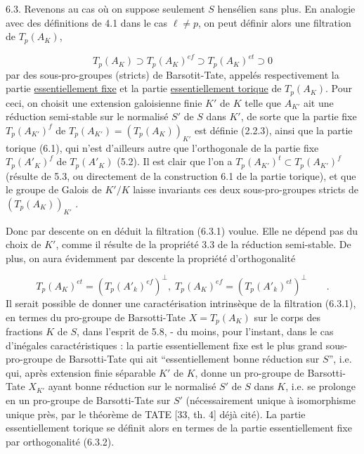 6.3. Revenons au cas où on suppose seulement $S$ hensélien sans plus. En analogie avec des définitions de 4.1 dans le cas $\ell \neq p$, on peut définir alors une filtration de $T_p(A_K)$,

\begin{equation}\tag{6.3.1}
T_p(A_K) \supset T_p(A_K)^{ef} \supset T_p(A_K)^{et} \supset 0
\end{equation}
par des sous-pro-groupes (stricts) de Barsotit-Tate, appelés respectivement la partie \underline{essentiellement fixe} et la partie \underline{essentiellement torique} de $T_p(A_K)$. Pour ceci, on choisit une extension galoisienne finie $K'$ de $K$ telle que $A_{K'}$ ait une réduction semi-stable sur le normalisé $S'$ de $S$ dans $K'$, de sorte que la partie fixe $T_p(A_{K'})^f$ de $T_p(A_{K'})=(T_p(A_K))_{K'}$ est définie (2.2.3), ainsi que la partie torique (6.1), qui n'est d'ailleurs autre que l'orthogonale de la partie fixe $T_p(A'_K)^f$ de $T_p(A'_K)$ (5.2). Il est clair que l'on a $T_p(A_{K'})^t \subset T_p(A_{K'})^f$ (résulte de 5.3, ou directement de la construction 6.1 de la partie torique), et que le groupe de Galois de $K'/K$ laisse invariants ces deux sous-pro-groupes stricts de $(T_p(A_K))_{K'}$ .



Donc par descente on en déduit la filtration (6.3.1) voulue. Elle ne dépend pas du choix de $K'$, comme il résulte de la propriété 3.3 de la réduction semi-stable. De plus, on aura évidemment par descente la propriété d'orthogonalité

\begin{equation}\tag{6.3.2}
T_p(A_K)^{et} = (T_p(A'_k)^{ef})^{\perp}, \; T_p(A_K)^{ef} = (T_p(A'_k)^{et})^{\perp} \qquad .
\end{equation}
Il serait possible de donner une caractérisation intrinsèque de la filtration (6.3.1), en termes du pro-groupe de Barsotti-Tate $X = T_p(A_K)$ sur le corps des fractions $K$ de $S$, dans l'esprit de 5.8, - du moins, pour l'instant, dans le cas d'inégales caractéristiques : la partie essentiellement fixe est le plus grand sous-pro-groupe de Barsotti-Tate qui ait ``essentiellement bonne réduction sur $S$'', i.e. qui, après extension finie séparable $K'$ de $K$, donne un pro-groupe de Barsotti-Tate $X_{K'}$ ayant bonne réduction sur le normalisé $S'$ de $S$ dans $K$, i.e. se prolonge en un pro-groupe de Barsotti-Tate sur $S'$ (nécessairement unique à isomorphisme unique près, par le théorème de TATE [33, th. 4] déjà cité). La partie essentiellement torique se définit alors en termes de la partie essentiellement fixe par orthogonalité (6.3.2).

